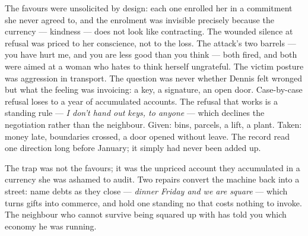 \begin{lattice}
   The favours were unsolicited by design: each one enrolled her in a commitment she never agreed to, and the enrolment was invisible precisely because the currency --- kindness --- does not look like contracting.
   The wounded silence at refusal was priced to her conscience, not to the loss. The attack's two barrels --- you have hurt me, and you are less good than you think --- both fired, and both were aimed at a woman who hates to think herself ungrateful.
   The victim posture was aggression in transport. The question was never whether Dennis felt wronged but what the feeling was invoicing: a key, a signature, an open door.
   Case-by-case refusal loses to a year of accumulated accounts. The refusal that works is a standing rule --- \emph{I don't hand out keys, to anyone} --- which declines the negotiation rather than the neighbour.
   Given: bins, parcels, a lift, a plant. Taken: money late, boundaries crossed, a door opened without leave. The record read one direction long before January; it simply had never been added up.
\end{lattice}

\begin{lesson}
The trap was not the favours; it was the unpriced account they accumulated in a currency she was ashamed to audit. Two repairs convert the machine back into a street: name debts as they close --- \emph{dinner Friday and we are square} --- which turns gifts into commerce, and hold one standing no that costs nothing to invoke. The neighbour who cannot survive being squared up with has told you which economy he was running.
\end{lesson}
